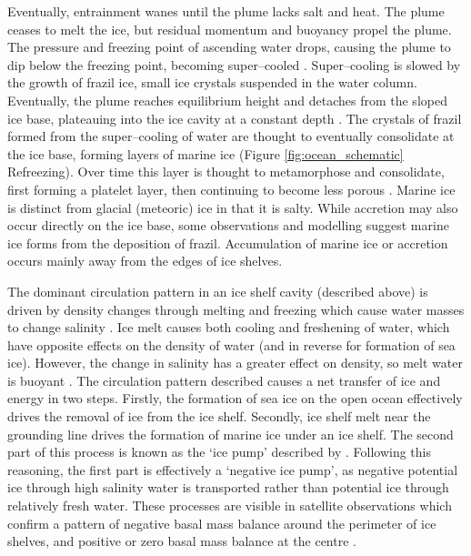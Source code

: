 Eventually, entrainment wanes until the plume lacks salt and heat. The plume ceases to melt the ice, but residual momentum and buoyancy propel the plume. The pressure and freezing point of ascending water drops, causing the plume to dip below the freezing point, becoming super--cooled \citep{holland2006effects}.  Super--cooling is slowed by the growth of frazil ice, small ice crystals suspended in the water column. Eventually, the plume reaches equilibrium height and detaches from the sloped ice base, plateauing into the ice cavity at a constant depth  \citep{hewitt2020subglacial}. 
The crystals of frazil formed from the super--cooling of water are thought to eventually consolidate at the ice base, forming layers of marine ice \cite[e.g.][]{fricker2001distribution} (Figure {\ref{fig:ocean_schematic}
} Refreezing).  Over time this layer is thought to metamorphose and consolidate, first forming  a platelet layer, then continuing to become less porous \citep{craven2009properties}. Marine ice is distinct from glacial (meteoric) ice in that it is salty. While accretion may also occur directly on the ice base, some observations \citep{vavnkova2021nature} and modelling \citep{bombosch1995modeling} suggest marine ice forms from the deposition of frazil.  Accumulation of marine ice or accretion occurs mainly away from the edges of ice shelves. 

The dominant circulation pattern in an ice shelf cavity (described above) is driven by density changes through melting and freezing which cause water masses to change salinity \citep{jacobs1979circulation}. Ice melt causes both cooling and freshening of water, which have opposite effects on the density of water (and in reverse for formation of sea ice). However, the change in salinity has a greater effect on density, so melt water is buoyant \citep{jenkins1991one}. The circulation pattern described causes a net transfer of ice and energy in two steps. Firstly, the formation of sea ice on the open ocean effectively drives the removal of ice from the ice shelf. Secondly, ice shelf melt near the grounding line drives the formation of marine ice under an ice shelf.
The second part of this process is known as the `ice pump' described by \cite{lewis1986ice}. Following this reasoning, the first part is effectively a `negative ice pump', as negative potential ice through high salinity water is transported rather than potential ice through relatively fresh water.
These processes are visible in satellite observations which confirm a pattern of negative basal mass balance around the perimeter of ice shelves, and positive or zero basal mass balance at the centre \citep[e.g.][]{rignot2013ice}. 




